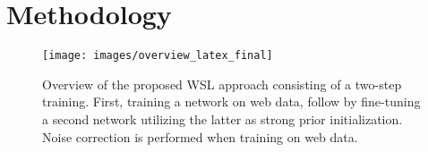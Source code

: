 \documentclass{llncs}
\begin{document}



\section{Methodology}
\begin{figure}[ht]
\begin{center}
\texttt{[image: images/overview\_latex\_final]}
\end{center}
\vspace{-10pt}
\caption{\small{Overview of the proposed WSL approach consisting of a two-step  training. First, training a network on web data, follow by fine-tuning a second network utilizing the latter as strong prior initialization. Noise correction is performed when training on web data.}}
\label{fig:overview}
\vspace{-0.68cm}
\end{figure}
\end{document}
